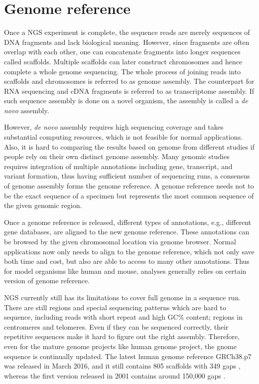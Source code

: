 \section{Genome reference}
\label{s:genome-ref}

Once a NGS experiment is complete, the sequence reads are merely sequences of
DNA fragments and lack biological meaning. However, since fragments are often
overlap with each other, one can concatenate fragments into longer sequences
called scaffolds. Multiple scaffolds can later construct chromosomes and hence
complete a whole genome sequencing. The whole process of joining reads into
scaffolds and chromosomes is referred to as genome assembly. The counterpart
for RNA sequencing and cDNA fragments is referred to as transcriptome assembly.
If such sequence assembly is done on a novel organism, the assembly is called
a \textit{de novo} assembly.

However, \textit{de novo} assembly requires high sequencing coverage and takes
substantial computing resources, which is not feasible for normal applications.
Also, it is hard to comparing the results based on genome from different
studies if people rely on their own distinct genome assembly. Many genomic
studies requires integration of multiple annotations including gene, transcript,
and variant formation, thus having sufficient number of sequencing runs, a
consensus of genome assembly forms the genome reference. A genome reference
needs not to be the exact sequence of a specimen but represents the most common
sequence of the given genomic region.

Once a genome reference is released, different types of annotations, e.g.,
different gene databases, are aligned to the new genome reference. These
annotations can be browsed by the given chromosomal location via genome
browser. Normal applications now only needs to align to the genome reference,
which not only save both time and cost, but also are able to access to many
other annotations. Thus for model organisms like human and mouse, analyses
generally relies on certain version of genome reference.


NGS currently still has its limitations to cover full genome in a sequence run.
There are still regions and special sequencing patterns which are hard to
sequence, including reads with short repeat and high GC\% content; regions in
centromeres and telomeres. Even if they can be sequenced correctly, their
repetitive sequences make it hard to figure out the right assembly. Therefore,
even for the mature genome projects like human genome project, the gnome
sequence is continually updated. The latest human genome reference GRCh38.p7
was released in March 2016, and it still contains 805 scaffolds with 349 gaps
\cite{:grch38p7}, whereas the first version released in 2001 contains around
150,000 gaps \cite{2010:e-pluribus-unum}.

